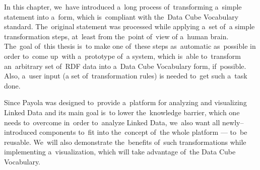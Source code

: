 In this chapter, we~have introduced a~long process of~transforming a~simple statement into
a~form, which is~compliant with the~Data Cube Vocabulary standard. The~original statement
was processed while applying a~set of~a simple transformation steps, at~least from the~point of~view
of a~human brain. The~goal of~this thesis is~to make one of~these steps as~automatic as~possible 
in order to~come up~with a~prototype of~a system, which is~able to~transform an~arbitrary set of~RDF data
into a~Data Cube Vocabulary form, if~possible. Also, a~user input (a set of~transformation rules) is
needed to~get such a~task done. 

Since Payola was designed to~provide a~platform for analyzing and visualizing 
Linked Data and its main goal is~to lower the~knowledge barrier, which one needs to~overcome in~order to~analyze Linked Data, we~also want all newly--introduced 
components to~fit into the~concept of~the whole platform --- to~be reusable. We~will also demonstrate the~benefits of~such transformations while implementing 
a~visualization, which will take advantage of~the Data Cube Vocabulary.
